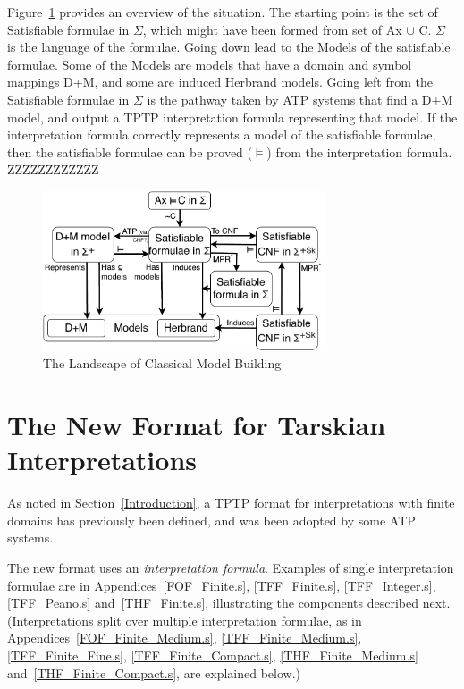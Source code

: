\documentclass{easychair}
\begin{document}
Figure~\ref{ModelLandscape} provides an overview of the situation.
The starting point is the set of {\sf Satisfiable formulae in $\Sigma$}, which might have been
formed from set of {\sf Ax $\cup$ {\raisebox{0.4ex}{\texttildelow}}C}. 
$\Sigma$ is the language of the formulae.
Going down lead to the {\sf Models} of the satisfiable formulae.
Some of the {\sf Models} are models that have a domain and symbol mappings {\sf D+M}, and some
are induced Herbrand models.
Going left from the {\sf Satisfiable formulae in $\Sigma$} is the pathway taken by ATP systems 
that find a {\sf D+M} model, and output a TPTP interpretation formula representing that model.
If the interpretation formula correctly represents a model of the satisfiable formulae, then
the satisfiable formulae can be proved ($\vDash$) from the interpretation formula.
ZZZZZZZZZZZZ

\begin{figure}[htbp]
\centering
\includegraphics[width=0.75\textwidth]{ModelLandscape.pdf}
\caption{The Landscape of Classical Model Building}
\label{ModelLandscape}
\end{figure}

\section{The New Format for Tarskian Interpretations}
\label{NewTarskian}

As noted in Section~\ref{Introduction}, a TPTP format for interpretations with finite domains 
has previously been defined, and was been adopted by some ATP systems.

The new format uses an {\em interpretation formula}. 
Examples of single interpretation formulae are in 
Appendices~\ref{FOF_Finite.s}, \ref{TFF_Finite.s}, \ref{TFF_Integer.s}, \ref{TFF_Peano.s} 
and~\ref{THF_Finite.s},
illustrating the components described next. 
(Interpretations split over multiple interpretation formulae, as in 
Appendices~\ref{FOF_Finite_Medium.s}, \ref{TFF_Finite_Medium.s}, \ref{TFF_Finite_Fine.s},
\ref{TFF_Finite_Compact.s}, \ref{THF_Finite_Medium.s} and~\ref{THF_Finite_Compact.s}, are 
explained below.)
\end{document}
